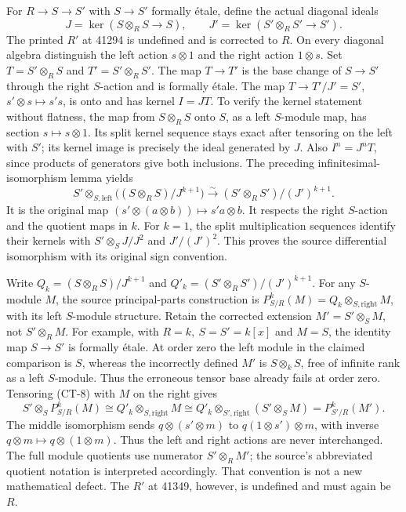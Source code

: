For \(R\to S\to S'\) with \(S\to S'\) formally étale, define the actual diagonal ideals \[
J=\ker(S\otimes_RS\to S),\qquad
J'=\ker(S'\otimes_RS'\to S').
\] The printed \(R'\) at 41294 is undefined and is corrected to \(R\). On every diagonal algebra distinguish the left action \(s\otimes1\) and the right action \(1\otimes s\). Set \(T=S'\otimes_RS\) and \(T'=S'\otimes_RS'\). The map \(T\to T'\) is the base change of \(S\to S'\) through the right \(S\)-action and is formally étale. The map \(T\to T'/J'=S'\), \(s'\otimes s\mapsto s's\), is onto and has kernel \(I=JT\). To verify the kernel statement without flatness, the map from \(S\otimes_RS\) onto \(S\), as a left \(S\)-module map, has section \(s\mapsto s\otimes1\). Its split kernel sequence stays exact after tensoring on the left with \(S'\); its kernel image is precisely the ideal generated by \(J\). Also \(I^n=J^nT\), since products of generators give both inclusions. The preceding infinitesimal-isomorphism lemma yields \[
S'\otimes_{S,\mathrm{left}}
\bigl((S\otimes_RS)/J^{k+1}\bigr)
\xrightarrow{\sim}(S'\otimes_RS')/(J')^{k+1}.
\tag{CT-8}
\] It is the original map \((s'\otimes(a\otimes b))\mapsto s'a\otimes b\). It respects the right \(S\)-action and the quotient maps in \(k\). For \(k=1\), the split multiplication sequences identify their kernels with \(S'\otimes_S J/J^2\) and \(J'/(J')^2\). This proves the source differential isomorphism with its original sign convention.

Write \(Q_k=(S\otimes_RS)/J^{k+1}\) and \(Q'_k=(S'\otimes_RS')/(J')^{k+1}\). For any \(S\)-module \(M\), the source principal-parts construction is \(P^k_{S/R}(M)=Q_k\otimes_{S,\mathrm{right}}M\), with its left \(S\)-module structure. Retain the corrected extension \(M'=S'\otimes_SM\), not \(S'\otimes_RM\). For example, with \(R=k,\ S=S'=k[x]\) and \(M=S\), the identity map \(S\to S'\) is formally étale. At order zero the left module in the claimed comparison is \(S\), whereas the incorrectly defined \(M'\) is \(S\otimes_kS\), free of infinite rank as a left \(S\)-module. Thus the erroneous tensor base already fails at order zero. Tensoring (CT-8) with \(M\) on the right gives \[
S'\otimes_S P^k_{S/R}(M)
\cong Q'_k\otimes_{S,\mathrm{right}}M
\cong Q'_k\otimes_{S',\mathrm{right}}(S'\otimes_SM)
=P^k_{S'/R}(M').
\tag{CT-9}
\] The middle isomorphism sends \(q\otimes(s'\otimes m)\) to \(q(1\otimes s')\otimes m\), with inverse \(q\otimes m\mapsto
q\otimes(1\otimes m)\). Thus the left and right actions are never interchanged. The full module quotients use numerator \(S'\otimes_RM'\); the source's abbreviated quotient notation is interpreted accordingly. That convention is not a new mathematical defect. The \(R'\) at 41349, however, is undefined and must again be \(R\).

